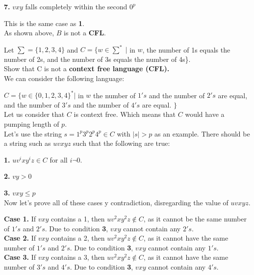 \documentclass[12pt]{article}
\begin{document}
\textbf{7.} $vxy$ falls completely within the second $0^p$

This is the same case as \textbf{1}. \\

As shown above, $B$ is not a \textbf{CFL}.

 Let $\sum = \{1, 2, 3, 4\}$ and $C = \{w \in \sum^* \; | $ in $w$, the number of 1s 
equals the number of 2s, and the number of 3s equals the number of 4s\}. \\
Show that C is not a \textbf{context free language (CFL).} \\

We can consider the following language:

$C = \{ w \in \{0, 1, 2, 3, 4 \}^* | $ in $w$ the number of $1's$ and the number of
$2's$ are equal, and the number of $3's$ and the number of $4's$ are equal. $\}$ \\

Let us consider that $C$ is context free. Which means that $C$ would have a pumping
length of $p$. \\

Let's use the string $s = 1^p 3^p 2^p 4^p \in C$ with $|s| > p$ as an example.
There should be a string such as $uvxyz$ such that the following are true:

\textbf{1.} $u v^i x y^i z \in C$ for all $i \neg 0$.

\textbf{2.} $vy > 0$

\textbf{3.} $vxy \le p$ \\

Now let's prove all of these cases y contradiction, disregarding the value of $uvxyz$.

\textbf{Case 1.} If $vxy$ contains a 1, then $u v^2 x y^2 z \notin C$, as it cannot
be the same number of $1's$ and $2's$. Due to condition \textbf{3}, $vxy$ cannot
contain any $2's$. \\

\textbf{Case 2.} If $vxy$ contains a 2, then $u v^2 x y^2 z \notin C$, as it cannot
have the same number of $1's$ and $2's$. Due to condition \textbf{3}, $vxy$ cannot
contain any $1's$. \\

\textbf{Case 3.} If $vxy$ contains a 3, then $u v^2 x y^2 z \notin C$, as it cannot
have the same number of $3's$ and $4's$. Due to condition \textbf{3}, $vxy$ cannot
contain any $4's$. \\
\end{document}
